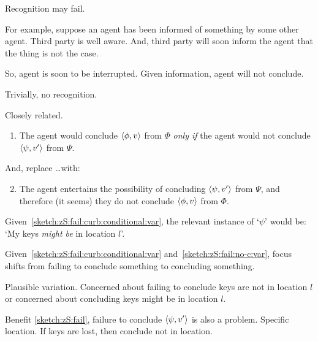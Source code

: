 \begin{note}
  Recognition may fail.

  For example, suppose an agent has been informed of something by some other agent.
  Third party is well aware.
  And, third party will soon inform the agent that the thing is not the case.

  So, agent is soon to be interrupted.
  Given information, agent will not conclude.

  Trivially, no recognition.
\end{note}

\begin{note}
  Closely related.
  \begin{enumerate}[label=\alph*\('\)., ref=(\alph*\('\))]
  \item
    \label{sketch:zS:fail:curb:conditional:var}
    The agent would conclude \(\langle \phi, v \rangle\) from \(\Phi\) \emph{only if} the agent would not conclude \(\langle \psi, v' \rangle\) from \(\Psi\).
  \end{enumerate}
  And, replace \dots with:
  \begin{enumerate}[label=\arabic*\('\)., ref=(\arabic*\('\))]
    \setcounter{enumi}{1}
  \item
    \label{sketch:zS:fail:no-c:var}
    The agent entertains the possibility of concluding \(\langle \psi, v' \rangle\) from \(\Psi\), and therefore (it seems) they do not conclude \(\langle \phi, v \rangle\) from \(\Phi\).
  \end{enumerate}

  Given~\ref{sketch:zS:fail:curb:conditional:var}, the relevant instance of `\(\psi\)' would be: `My keys \emph{might be} in location \(l\)'.

  Given~\ref{sketch:zS:fail:curb:conditional:var} and~\ref{sketch:zS:fail:no-c:var}, focus shifts from failing to conclude something to concluding something.

  Plausible variation.
  Concerned about failing to conclude keys are not in location \(l\) or concerned about concluding keys might be in location \(l\).

  Benefit \ref{sketch:zS:fail}, failure to conclude \(\langle \psi, v' \rangle\) is also a problem.
  Specific location.
  If keys are lost, then conclude not in location.
\end{note}

